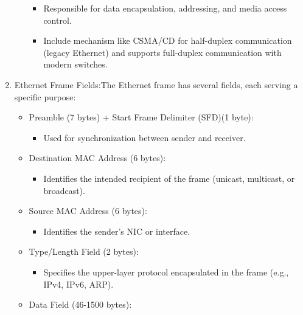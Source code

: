 \documentclass[a4paper,11pt]{article}
\begin{document}
\begin{enumerate}
\begin{itemize}
\begin{itemize}
            \item Responsible for data encapsulation, addressing, and media access control.\\
            \item Include mechanism like CSMA/CD for half-duplex communication (legacy Ethernet) and supports full-duplex communication with modern switches.\\
        \end{itemize}
    \end{itemize}
    \item Ethernet Frame Fields:The Ethernet frame has several fields, each serving a specific purpose:\\
    \begin{itemize}
        \item Preamble (7 bytes) + Start Frame Delimiter (SFD)(1 byte):\\
        \begin{itemize}
            \item Used for synchronization between sender and receiver.\\
        \end{itemize}
        \item Destination MAC Address (6 bytes):\\
        \begin{itemize}
            \item Identifies the intended recipient of the frame (unicast, multicast, or broadcast).\\
        \end{itemize}
        \item Source MAC Address (6 bytes):\\
        \begin{itemize}
            \item Identifies the sender's  NIC or  interface.\\
        \end{itemize}
        \item Type/Length Field (2 bytes):\\
        \begin{itemize}
            \item Specifies the upper-layer protocol encapsulated in the frame (e.g., IPv4, IPv6, ARP).
        \end{itemize}
        \item Data Field (46-1500 bytes):\\
        \begin{itemize}

\end{itemize}
\end{itemize}
\end{enumerate}
\end{document}
